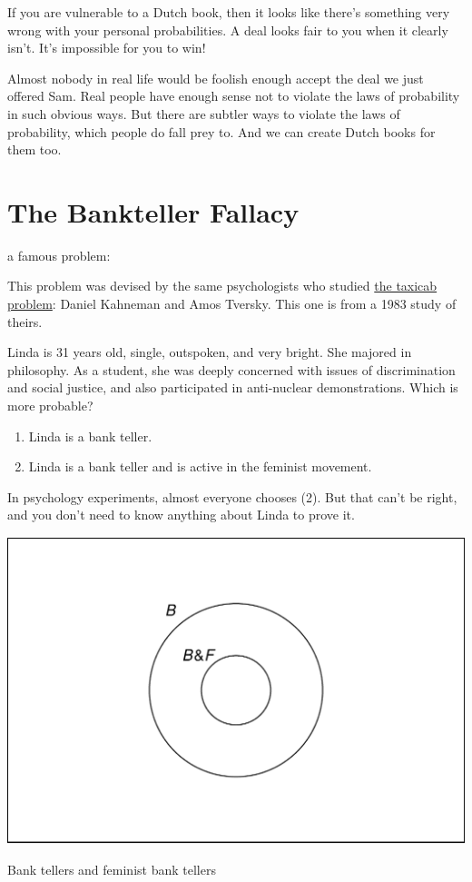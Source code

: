 \documentclass[justified]{tufte-book}
\providecommand{\tightlist}{%
  \setlength{\itemsep}{0pt}\setlength{\parskip}{0pt}}
\theoremstyle{definition}
\theoremstyle{definition}
\theoremstyle{definition}
\theoremstyle{remark}
\let\BeginKnitrBlock\begin \let\EndKnitrBlock\end
\begin{document}
If you are vulnerable to a Dutch book, then it looks like there's
something very wrong with your personal probabilities. A deal looks fair
to you when it clearly isn't. It's impossible for you to win!

Almost nobody in real life would be foolish enough accept the deal we
just offered Sam. Real people have enough sense not to violate the laws
of probability in such obvious ways. But there are subtler ways to
violate the laws of probability, which people do fall prey to. And we
can create Dutch books for them too.

\hypertarget{bankteller}{%
\section{The Bankteller Fallacy}\label{bankteller}}

 a famous problem:

\begin{marginfigure}
This problem was devised by the same psychologists who studied
\protect\hyperlink{chbayes}{the taxicab problem}: Daniel Kahneman and
Amos Tversky. This one is from a 1983 study of theirs.
\end{marginfigure}

\BeginKnitrBlock{puzzle}
Linda is 31 years old, single, outspoken, and very bright. She majored
in philosophy. As a student, she was deeply concerned with issues of
discrimination and social justice, and also participated in anti-nuclear
demonstrations. Which is more probable?

\begin{enumerate}
\def\labelenumi{\arabic{enumi}.}
\tightlist
\item
  Linda is a bank teller.
\item
  Linda is a bank teller and is active in the feminist movement.
\end{enumerate}
\EndKnitrBlock{puzzle}

In psychology experiments, almost everyone chooses (2). But that can't
be right, and you don't need to know anything about Linda to prove it.

\begin{marginfigure}
\includegraphics{_main_files/figure-latex/bankteller-1} \caption[Bank tellers and feminist bank tellers]{Bank tellers and feminist bank tellers}\label{fig:bankteller}
\end{marginfigure}
\end{document}
